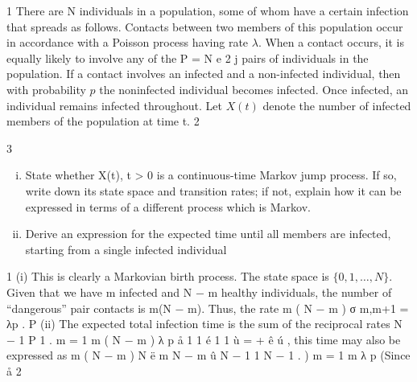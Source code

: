 \documentclass[a4paper,12pt]{article}
\begin{document}
1
There are N individuals in a population, some of whom have a certain infection that spreads as follows. Contacts between two members of this population occur in accordance with a Poisson process having rate $\lambda$. When a contact occurs, it is
equally likely to involve any of the P =
N
e 2 j
pairs of individuals in the population.
If a contact involves an infected and a non-infected individual, then with probability $p$ the noninfected individual becomes infected. Once infected, an individual remains infected throughout. Let $X(t)$ denote the number of infected members of the population at time t.
2


3

\begin{enumerate}[(i)]
\item %
State whether X(t), t > 0 is a continuous-time Markov jump process. If so, write down its state space and transition rates; if not, explain how it can be expressed in terms of a different process which is Markov.

\item %
Derive an expression for the expected time until all members are infected, starting from a single infected individual
\end{enumerate}

1
(i)
This is clearly a Markovian birth process. The state space is $\{0, 1, \ldots , N\}$.
Given that we have m infected and N − m healthy individuals, the
number of “dangerous” pair contacts is m(N − m). Thus, the rate
m ( N − m )
σ m,m+1 = λp
.
P
(ii)
The expected total infection time is the sum of the reciprocal rates
N − 1
P
1
.
m
=
1
m ( N − m )
λ p
å
1
1 é 1
1 ù
=
+
ê
ú , this time may also be expressed as
m ( N − m )
N ë m N − m û
N − 1 1
N − 1
. )
m
= 1 m
λ p
(Since
å
2
\end{document}
